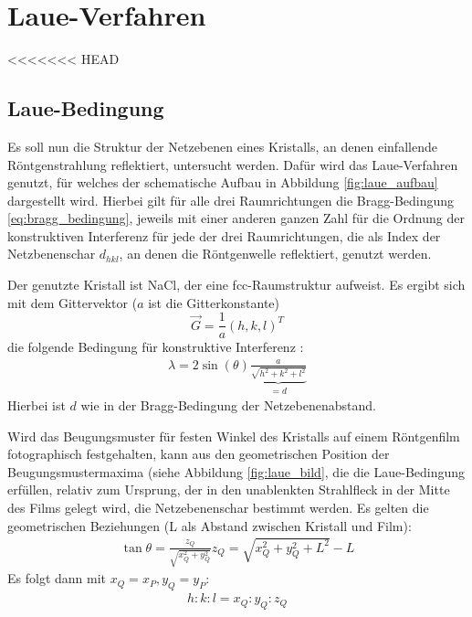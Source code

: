 \chapter{Laue-Verfahren}

<<<<<<< HEAD
\section{Laue-Bedingung}

Es soll nun die Struktur der Netzebenen eines Kristalls, an denen einfallende Röntgenstrahlung reflektiert, untersucht werden. Dafür wird das Laue-Verfahren genutzt, für welches der schematische Aufbau in Abbildung \ref{fig:laue_aufbau} dargestellt wird. Hierbei gilt für alle drei Raumrichtungen die Bragg-Bedingung \ref{eq:bragg_bedingung}, jeweils mit einer anderen ganzen Zahl für die Ordnung der konstruktiven Interferenz für jede der drei Raumrichtungen, die als Index der Netzbenenschar $d_{hkl}$, an denen die Röntgenwelle reflektiert, genutzt werden.


Der genutzte Kristall ist NaCl, der eine fcc-Raumstruktur aufweist.  Es ergibt sich mit dem Gittervektor ($a$ ist die Gitterkonstante) \[
\vec{G}= \frac{1}{a} (h, k, l)^T
\]
die folgende Bedingung für konstruktive Interferenz \cite{LDlaue}:
\begin{align}
	\lambda = 2 \sin{(\theta)} \underbrace{\frac{a}{\sqrt{h^2 +k^2+l^2}}}_{=d}
\end{align}
Hierbei ist $d$ wie in der Bragg-Bedingung der Netzebenenabstand.

Wird das Beugungsmuster für festen Winkel des Kristalls auf einem Röntgenfilm fotographisch festgehalten, kann aus den geometrischen Position der Beugungsmustermaxima (siehe Abbildung \ref{fig:laue_bild}, die die Laue-Bedingung erfüllen, relativ zum Ursprung, der in den unablenkten Strahlfleck in der Mitte des Films gelegt wird, die Netzebenenschar bestimmt werden. Es gelten die geometrischen Beziehungen (L als Abstand zwischen Kristall und Film):
\begin{align}
    \tan{{\theta}} = \frac{z_Q}{\sqrt{x_Q^2+y_Q^2}}
	z_Q = \sqrt{x_Q^2 + y^2_Q + L^2}-L
\end{align}
Es folgt dann mit $x_Q = x_P, y_Q = y_P$:
\begin{align}
	h : k : l = x_Q : y_Q : z_Q
\end{align}

